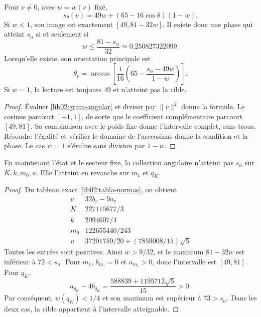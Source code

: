 \begin{proposition}
\label{lib02:alcanzabilidad}
Pour \(v\ne0\), avec \(w=w(v)\) fixé,
\[
 s_\theta(v)=49w+(65-16\cos\theta)(1-w).
\]
Si \(w<1\), son image est exactement
\([49,81-32w]\). Il existe donc une phase qui atteint
\(s_\alpha\) si et seulement si
\[
 w\leq\frac{81-s_\alpha}{32}\simeq0.250827322099.
\]
Lorsqu'elle existe, son orientation principale est
\[
 \theta_v=\arccos\left[
 \frac1{16}\left(65-\frac{s_\alpha-49w}{1-w}\right)\right].
\]
Si \(w=1\), la lecture est toujours 49 et n'atteint pas la cible.
\end{proposition}
\begin{proof}
Évaluer \eqref{lib02:gram-angular} et diviser par \(\|v\|^2\)
donne la formule. Le cosinus parcourt \([-1,1]\), de sorte que le
coefficient complémentaire parcourt \([49,81]\). Sa combinaison avec
le poids fixe donne l’intervalle complet, sans trous. Résoudre l’égalité
et vérifier le domaine de l’arccosinus donne la condition et la phase.
Le cas \(w=1\) s’évalue sans division par \(1-w\).
\end{proof}

\begin{corollary}
\label{lib02:seis-angulares}
En maintenant l’état et le secteur fixe, la collection angulaire n’atteint pas
\(s_\alpha\) sur \(K,k,m_0,u\). Elle l’atteint en revanche sur
\(m_1\) et \(q_K\).
\end{corollary}
\begin{proof}
Du tableau exact \eqref{lib02:tabla-normas}, on obtient
\[
\begin{array}{c|c}
 v&32b_v-9a_v\\\hline
 K&227115677/3\\
 k&2094607/4\\
 m_0&122655440/243\\
 u&37201759/20+(7859008/15)\sqrt5
\end{array}
\]
Toutes les entrées sont positives. Ainsi \(w>9/32\), et le maximum \(81-32w\) est inférieur à \(72<s_\alpha\). Pour \(m_1\), \(b_{m_1}=0\) et \(a_{m_1}>0\), donc l'intervalle est \([49,81]\). Pour \(q_K\),
\[
 a_{q_K}-4b_{q_K}=\frac{588839+1195712\sqrt5}{15}>0.
\]
Par conséquent, \(w(q_K)<1/4\) et son maximum est supérieur à
\(73>s_\alpha\). Dans les deux cas, la cible appartient à
l’intervalle atteignable.
\end{proof}

